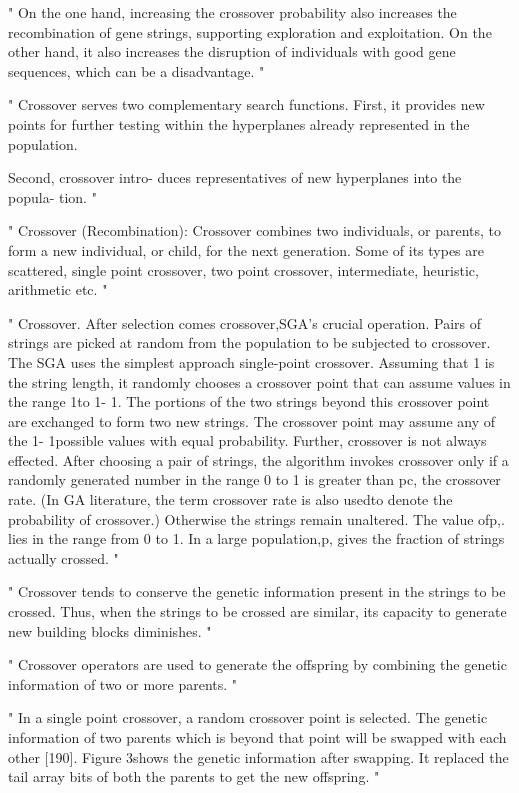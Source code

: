 "
On the one hand, increasing the crossover probability also increases the recombination of gene strings, supporting exploration and exploitation. On the other hand, it also increases the disruption of individuals with good gene sequences, which can be a disadvantage.
"\cite{klampfl_using_nodate}

"
Crossover serves two complementary search functions.
First, it provides new points for further testing within the hyperplanes already represented in the population.

Second, crossover intro- duces representatives of new hyperplanes into the popula- tion.
"\cite{grefenstette_optimization_1986}

"
Crossover (Recombination): Crossover combines two individuals, or parents, to form a new individual, or child, for the next generation. Some of its types are scattered, single point crossover, two point crossover, intermediate, heuristic, arithmetic etc.
"\cite{majumdar_genetic_2015}


"
Crossover. After selection comes crossover,SGA's crucial operation. Pairs of strings are picked at random from the population to be subjected to crossover. The SGA uses the simplest approach single-point crossover. Assuming that 1 is the string length, it randomly chooses a crossover point that can assume values in the range 1to 1- 1. The portions of the two strings beyond this crossover point are exchanged to form two new strings. The crossover point may assume any of the 1- 1possible values with equal probability. Further, crossover is not always effected. After choosing a pair of strings, the algorithm invokes crossover only if a randomly generated number in the range 0 to 1 is greater than pc, the crossover rate. (In GA literature, the term crossover rate is also usedto denote the probability of crossover.) Otherwise the strings remain unaltered. The value ofp,. lies in the range from 0 to 1. In a large population,p, gives the fraction of strings actually crossed.
"\cite{srinivas_genetic_1994}

"
Crossover tends to conserve the genetic information present in the strings to be crossed. Thus, when the strings to be crossed are similar, its capacity to generate new building blocks diminishes.
"\cite{srinivas_genetic_1994}

"
Crossover operators are used to generate the offspring by combining the genetic information of two or more parents.
"\cite{katoch_review_2021}

"
In a single point crossover, a random crossover point is selected. The genetic information of two parents which is beyond that point will be swapped with each other [190]. Figure 3shows the genetic information after swapping. It replaced the tail array bits of both the parents to get the new offspring.
"\cite{katoch_review_2021}


